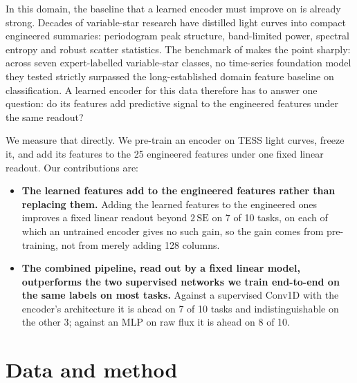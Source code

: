 \documentclass{article}
\begin{document}
In this domain, the baseline that a learned encoder must improve on is already strong. Decades of variable-star
research have distilled light curves into compact engineered summaries: periodogram peak structure,
band-limited power, spectral entropy and robust scatter statistics. The benchmark of \citet{li2025staremb} makes the point
sharply: across seven expert-labelled variable-star classes, no time-series foundation model they
tested strictly surpassed the long-established domain feature baseline on classification. A learned
encoder for this data therefore has to answer one question: do its features add predictive signal to
the engineered features under the same readout?

We measure that directly. We pre-train an encoder on TESS light curves, freeze it, and add its
features to the 25 engineered features under one fixed linear readout. Our contributions are:

\begin{itemize}
\item \textbf{The learned features add to the engineered features rather than replacing them.}
Adding the learned features to the engineered ones improves a fixed linear readout beyond
$2\,\mathrm{SE}$ on 7 of 10 tasks, on each of which an untrained encoder gives no such gain, so the gain comes
from pre-training, not from merely adding 128 columns.
\item \textbf{The combined pipeline, read out by a fixed linear model, outperforms the two
supervised networks we train end-to-end on the same labels on most tasks.} Against a supervised Conv1D with the
encoder's architecture it is ahead on 7
of 10 tasks and indistinguishable on the other 3; against an MLP on raw flux it is ahead on 8 of 10.
\end{itemize}

\section{Data and method}
\end{document}
